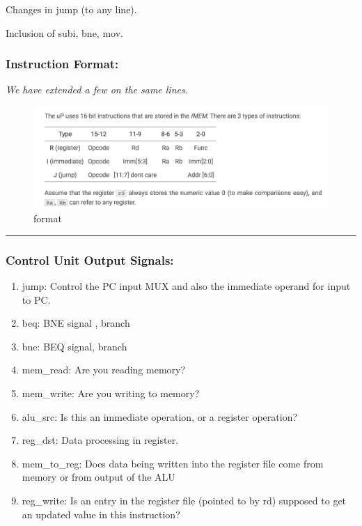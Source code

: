 \documentclass[11pt]{article}
\makeatletter
\def\maxwidth{\ifdim\Gin@nat@width>\linewidth\linewidth
    \else\Gin@nat@width\fi}
\let\Oldincludegraphics\includegraphics
\renewcommand{\includegraphics}[1]{\Oldincludegraphics[width=.8\maxwidth]{#1}}
\makeatother
\begin{document}
Changes in jump (to any line).

Inclusion of subi, bne, mov.

\subsubsection{Instruction Format:}\label{instruction-format}

\emph{We have extended a few on the same lines.}

\begin{figure}
\centering
\includegraphics{./instr.png}
\caption{format}
\end{figure}

\begin{center}\rule{0.5\linewidth}{\linethickness}\end{center}

\subsubsection{Control Unit Output
Signals:}\label{control-unit-output-signals}

\begin{enumerate}
\def\labelenumi{\arabic{enumi}.}
\item
  jump: Control the PC input MUX and also the immediate operand for
  input to PC.
\item
  beq: BNE signal , branch
\item
  bne: BEQ signal, branch
\item
  mem\_read: Are you reading memory?
\item
  mem\_write: Are you writing to memory?
\item
  alu\_src: Is this an immediate operation, or a register operation?
\item
  reg\_dst: Data processing in register.
\item
  mem\_to\_reg: Does data being written into the register file come from
  memory or from output of the ALU
\item
  reg\_write: Is an entry in the register file (pointed to by rd)
  supposed to get an updated value in this instruction?
\end{enumerate}
\end{document}
